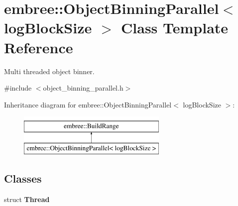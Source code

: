 \hypertarget{classembree_1_1_object_binning_parallel}{
\section{embree::ObjectBinningParallel$<$ logBlockSize $>$ Class Template Reference}
\label{classembree_1_1_object_binning_parallel}
}


Multi threaded object binner.  




{\ttfamily \#include $<$object\_\-binning\_\-parallel.h$>$}

Inheritance diagram for embree::ObjectBinningParallel$<$ logBlockSize $>$:\begin{figure}[H]
\begin{center}
\leavevmode
\includegraphics[height=2.000000cm]{classembree_1_1_object_binning_parallel}
\end{center}
\end{figure}
\subsection*{Classes}
\begin{DoxyCompactItemize}
\item 
struct {\bfseries Thread}
\end{DoxyCompactItemize}
